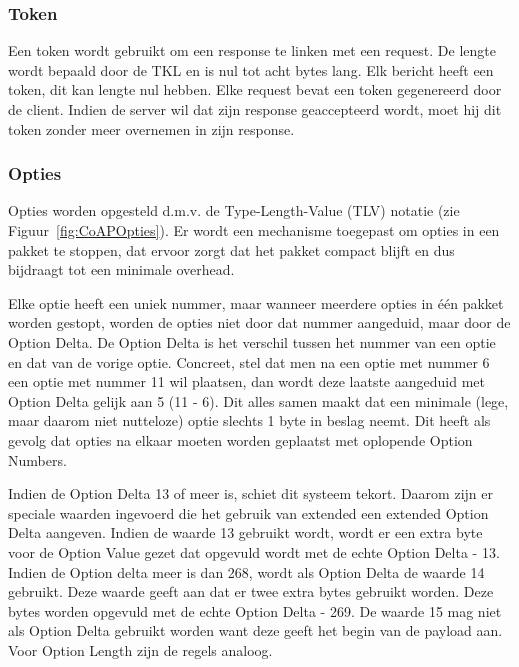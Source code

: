 \subsubsection{Token}

Een token wordt gebruikt om een response te linken met een request. De lengte wordt bepaald door de TKL en is nul tot acht bytes lang. Elk bericht heeft een token, dit kan lengte nul hebben. Elke request bevat een token gegenereerd door de client. Indien de server wil dat zijn response geaccepteerd wordt, moet hij dit token zonder meer overnemen in zijn response.

\newpage

\subsubsection{Opties}

Opties worden opgesteld d.m.v. de Type-Length-Value (TLV) notatie (zie Figuur~\ref{fig:CoAPOpties}). Er wordt een mechanisme toegepast om opties in een pakket te stoppen, dat ervoor zorgt dat het pakket compact blijft en dus bijdraagt tot een minimale overhead.

Elke optie heeft een uniek nummer, maar wanneer meerdere opties in \'{e}\'{e}n pakket worden gestopt, worden de opties niet door dat nummer aangeduid, maar door de Option Delta. De Option Delta is het verschil tussen het nummer van een optie en dat van de vorige optie.
Concreet, stel dat men na een optie met nummer 6 een optie met nummer 11 wil plaatsen, dan wordt deze laatste aangeduid met Option Delta gelijk aan 5 (11 - 6). Dit alles samen maakt dat een minimale (lege, maar daarom niet nutteloze) optie slechts 1 byte in beslag neemt. Dit heeft als gevolg dat opties na elkaar moeten worden geplaatst met oplopende Option Numbers.

Indien de Option Delta 13 of meer is, schiet dit systeem tekort. Daarom zijn er speciale waarden ingevoerd die het gebruik van extended een extended Option Delta aangeven. Indien de waarde 13 gebruikt wordt, wordt er een extra byte voor de Option Value gezet dat opgevuld wordt met de echte Option Delta - 13. Indien de Option delta meer is dan 268, wordt als Option Delta de waarde 14 gebruikt. Deze waarde geeft aan dat er twee extra bytes gebruikt worden. Deze bytes worden opgevuld met de echte Option Delta - 269. De waarde 15 mag niet als Option Delta gebruikt worden want deze geeft het begin van de payload aan. Voor Option Length zijn de regels analoog.



